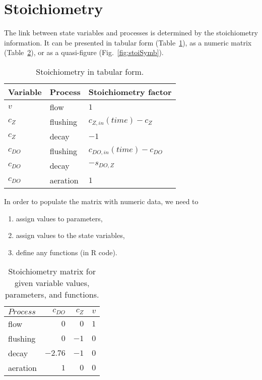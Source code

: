 \documentclass[a4paper,10pt]{article}
\begin{document}

\section{Stoichiometry}

The link between state variables and processes is determined by the stoichiometry information. It can be presented in tabular form (Table~\ref{tab:stoiExpr}), as a numeric matrix (Table~\ref{tab:stoiNum}), or as a quasi-figure (Fig.~\ref{fig:stoiSymb}).

\begin{table}[!h]
  \caption{Stoichiometry in tabular form. \label{tab:stoiExpr}}
  \begin{center}
  \begin{tabular}{lll}\hline
    \textbf{Variable} & \textbf{Process} & \textbf{Stoichiometry factor} \\ \hline
    $v$ & flow & $1$ \\
    $c_Z$ & flushing & $c_{Z,in}(time) - c_Z$ \\
    $c_Z$ & decay & $-1$ \\
    $c_{DO}$ & flushing & $c_{DO,in}(time) - c_{DO}$ \\
    $c_{DO}$ & decay & $-s_{DO,Z}$ \\
    $c_{DO}$ & aeration & $1$ \\ \hline
  \end{tabular}  \end{center}
\end{table}

In order to populate the matrix with numeric data, we need to
\begin{enumerate}
  \item assign values to parameters,
  \item assign values to the state variables,
  \item define any functions (in R code).
\end{enumerate}


\begin{table}[!h]
  \begin{center}
  \caption{Stoichiometry matrix for given variable values, parameters, and functions. \label{tab:stoiNum}}
  \begin{tabular}{lrrr}\hline
    $Process$ & $c_{DO}$ & $c_Z$ & $v$ \\ \hline
    flow & $0$ & $0$ & $1$ \\
    flushing & $0$ & $-1$ & $0$ \\
    decay & $-2.76$ & $-1$ & $0$ \\
    aeration & $1$ & $0$ & $0$ \\ \hline
  \end{tabular}  \end{center}
\end{table}
\end{document}
